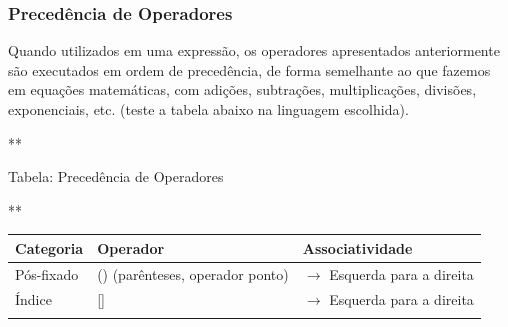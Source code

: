 \documentclass[12pt,a4paper]{article}
\begin{document}
    \hypertarget{preceduxeancia-de-operadores}{%
\subsubsection{Precedência de
Operadores}\label{preceduxeancia-de-operadores}}

    Quando utilizados em uma expressão, os operadores apresentados
anteriormente são executados em ordem de precedência, de forma
semelhante ao que fazemos em equações matemáticas, com adições,
subtrações, multiplicações, divisões, exponenciais, etc. (teste a tabela
abaixo na linguagem escolhida).

    **

Tabela: Precedência de Operadores

**

\begin{longtable}[]{@{}lll@{}}
\toprule
\begin{minipage}[b]{0.26\columnwidth}\raggedright
Categoria\strut
\end{minipage} & \begin{minipage}[b]{0.44\columnwidth}\raggedright
Operador\strut
\end{minipage} & \begin{minipage}[b]{0.21\columnwidth}\raggedright
Associatividade\strut
\end{minipage}\tabularnewline
\midrule
\endhead
\begin{minipage}[t]{0.26\columnwidth}\raggedright
Pós-fixado\strut
\end{minipage} & \begin{minipage}[t]{0.44\columnwidth}\raggedright
() (parênteses, operador ponto)\strut
\end{minipage} & \begin{minipage}[t]{0.21\columnwidth}\raggedright
\(\rightarrow\) Esquerda para a direita\strut
\end{minipage}\tabularnewline
\begin{minipage}[t]{0.26\columnwidth}\raggedright
Índice\strut
\end{minipage} & \begin{minipage}[t]{0.44\columnwidth}\raggedright
{[}{]}\strut
\end{minipage} & \begin{minipage}[t]{0.21\columnwidth}\raggedright
\(\rightarrow\) Esquerda para a direita\strut
\end{minipage}\tabularnewline
\begin{minipage}[t]{0.26\columnwidth}\raggedright

\end{minipage}
\end{longtable}
\end{document}
